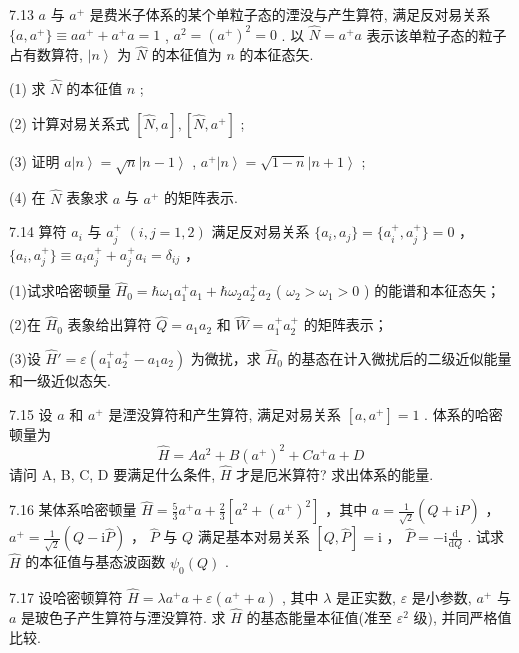 \vfill\newpage

7.13 $a$ 与 $a^{+}$ 是费米子体系的某个单粒子态的湮没与产生算符, 满足反对易关系 $\{a, a^{+}\} \equiv aa^{+} + a^{+}a = 1$ , $a^{2} = (a^{+})^{2} = 0$ . 以 $\hat{N} = a^{+}a$ 表示该单粒子态的粒子占有数算符, $\left|n\right\rangle$ 为 $\hat{N}$ 的本征值为 $n$ 的本征态矢. 

(1) 求 $\hat{N}$ 的本征值 $n$ ; 

(2) 计算对易关系式 $[\hat{N}, a], [\hat{N}, a^{+}]$ ; 

(3) 证明 $a\left|n\right\rangle = \sqrt{n}\left|n - 1\right\rangle$ , $a^{+}\left|n\right\rangle = \sqrt{1 - n}\left|n + 1\right\rangle$ ; 

(4) 在 $\hat{N}$ 表象求 $a$ 与 $a^{+}$ 的矩阵表示.

\vfill\newpage

7.14 算符 $a_{i}$ 与 $a_{j}^{+}$ $(i,j = 1,2)$ 满足反对易关系 $\{a_i,a_j\} = \{a_i^+,a_j^+\} = 0$ ， $\{a_i,a_j^+\} \equiv a_i a_j^+ + a_j^+ a_i = \delta_{ij}$ ，

(1)试求哈密顿量 $\hat{H}_0 = \hbar \omega_1 a_1^+ a_1 + \hbar \omega_2 a_2^+ a_2$ ( $\omega_2 > \omega_1 > 0$ ) 的能谱和本征态矢；

(2)在 $\hat{H}_0$ 表象给出算符 $\hat{Q} = a_1 a_2$ 和 $\hat{W} = a_1^+ a_2^+$ 的矩阵表示；

(3)设 $\hat{H}' = \varepsilon (a_1^+ a_2^+ - a_1 a_2)$ 为微扰，求 $\hat{H}_0$ 的基态在计入微扰后的二级近似能量和一级近似态矢.

\vfill\newpage



7.15 设 $a$ 和 $a^{+}$ 是湮没算符和产生算符, 满足对易关系 $[a, a^{+}] = 1$ . 体系的哈密顿量为
\begin{equation}\tag{1}
    \hat {H} = A a ^ {2} + B (a ^ {+}) ^ {2} + C a ^ {+} a + D
\end{equation}
请问 A, B, C, D 要满足什么条件, $\hat{H}$ 才是厄米算符? 求出体系的能量.

\vfill\newpage

7.16 某体系哈密顿量 $\hat{H} = \frac{5}{3} a^{+}a + \frac{2}{3} [a^{2} + (a^{+})^{2}]$ ，其中 $a = \frac{1}{\sqrt{2}} (Q + \mathrm{i}\hat{P})$ ， $a^{+} = \frac{1}{\sqrt{2}} (Q - \mathrm{i}\hat{P})$ ， $\hat{P}$ 与 $Q$ 满足基本对易关系 $[Q, \hat{P}] = \mathrm{i}$ ， $\hat{P} = -\mathrm{i}\frac{\mathrm{d}}{\mathrm{d}Q}$ . 试求 $\hat{H}$ 的本征值与基态波函数 $\psi_{0}(Q)$ .

\vfill\newpage

7.17 设哈密顿算符 $\hat{H} = \lambda a^{+}a + \varepsilon (a^{+} + a)$ , 其中 $\lambda$ 是正实数, $\varepsilon$ 是小参数, $a^{+}$ 与 $a$ 是玻色子产生算符与湮没算符. 求 $\hat{H}$ 的基态能量本征值(准至 $\varepsilon^2$ 级), 并同严格值比较.

